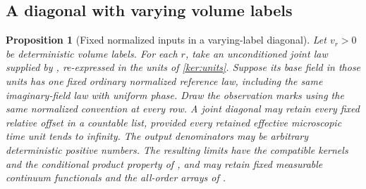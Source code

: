 \documentclass[11pt]{article}
\numberwithin{equation}{section}
\newtheorem{proposition}[theorem]{Proposition}
\theoremstyle{definition}
\theoremstyle{remark}
\newcommand{\1}{\mathbf 1}
\begin{document}
\subsection{A diagonal with varying volume labels}

\begin{proposition}[Fixed normalized inputs in a varying-label diagonal]
\label{ker:normalized-diagonal}
Let \(v_r>0\) be deterministic volume labels. For each \(r\), take an
unconditioned joint law supplied by ,
re-expressed in the units of \eqref{ker:units}. Suppose its base field
in those units has one fixed ordinary normalized reference law,
including the same imaginary-field law with uniform phase. Draw the
observation marks using the same normalized convention at every row.
A joint diagonal may retain every
fixed relative offset in a countable list, provided every retained
effective microscopic time unit tends to infinity.
The output denominators may be arbitrary deterministic positive
numbers. The resulting limits have the compatible kernels and the
conditional product property of , and may
retain fixed measurable continuum functionals and the all-order
arrays of .
\end{proposition}
\end{document}
